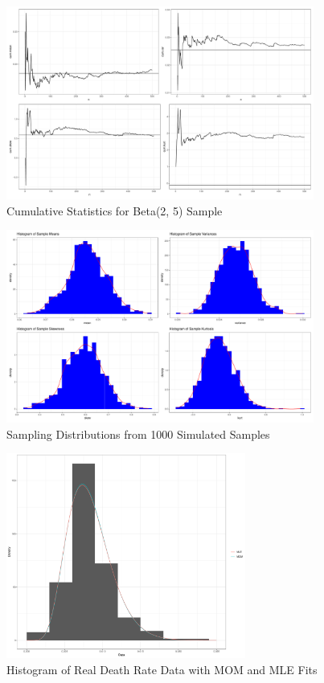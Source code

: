 \documentclass{article}\usepackage[]{graphicx}\usepackage[]{xcolor}
\begin{document}
\begin{figure}[h]
\centering
\includegraphics[width=0.9\textwidth]{cum_stats_plots.pdf}
\caption{Cumulative Statistics for Beta(2, 5) Sample}
\end{figure}

\begin{figure}[h]
\centering
\includegraphics[width=0.9\textwidth]{sample_stats_histograms.pdf}
\caption{Sampling Distributions from 1000 Simulated Samples}
\end{figure}

\begin{figure}[h]
\centering
\includegraphics[width=0.7\textwidth]{MOM_MLE_histogram.pdf}
\caption{Histogram of Real Death Rate Data with MOM and MLE Fits}
\end{figure}
\end{document}
